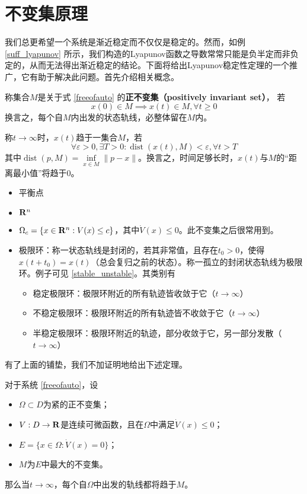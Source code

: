 \section{不变集原理}\label{2Dref}
我们总更希望一个系统是渐近稳定而不仅仅是稳定的。然而，如例 \ref{suff_lyapunov} 所示，我们构造的Lyapunov函数之导数常常只能是负半定而非负定的，从而无法得出渐近稳定的结论。下面将给出Lyapunov稳定性定理的一个推广，它有助于解决此问题。首先介绍相关概念。
\begin{definition}
	称集合$M$是关于式 \eqref{freeofauto} 的{\bf 正不变集（positively invariant set）}，
	若\[x(0)\in M\implies x(t)\in M,\forall t\ge0\]
	换言之，每个自$M$内出发的状态轨线，必整体留在$M$内。
\end{definition}
\begin{definition}
	称$t\to\infty$时，$x(t)$趋于一集合$M$，若\[\forall \varepsilon>0,\exists T>0:\operatorname{dist}(x(t),M)<\varepsilon,\forall t>T\]
	其中$\operatorname{dist}(p,M)=\inf\limits_{x\in M}\|p-x\|$。换言之，时间足够长时，$x(t)$与$M$的“距离最小值”将趋于0。
\end{definition}
\begin{example}[不变集]\label{invset}
	\begin{itemize}[leftmargin=1em]
		\item 平衡点
		\item $\mathbf{R}{}^n$
		\item $\Omega_c=\{x\in\mathbf{R}{}^n:V(x)\le c\}$，其中$\dot{V}(x)\le 0$。此不变集之后很常用到。
		\item 极限环：称一状态轨线是封闭的，若其非常值，且存在$t_0>0$，使得$x(t+t_0)=x(t)$（总会复归之前的状态）。称一孤立的封闭状态轨线为极限环。例子可见 \ref{stable_unstable}。其类别有
		\begin{itemize}[leftmargin=1em]
			\item 稳定极限环：极限环附近的所有轨迹皆收敛于它（$t\to\infty$）
			\item 不稳定极限环：极限环附近的所有轨迹皆不收敛于它（$t\to\infty$）
			\item 半稳定极限环：极限环附近的轨迹，部分收敛于它，另一部分发散（$t\to\infty$）
		\end{itemize}
	\end{itemize}
\end{example}
有了上面的铺垫，我们不加证明地给出下述定理。
\begin{theorem}[LaSalle不变集原理]\label{lasalle}
	对于系统 \eqref{freeofauto}，设\begin{itemize}[leftmargin=1em]
		\item $\Omega\subset D$为紧的正不变集；
		\item $V:D\to\mathbf{R}{}$是连续可微函数，且在$\Omega$中满足$\dot{V}(x)\le 0$；
		\item $E=\{x\in\Omega: \dot{V}(x)= 0\}$；
		\item $M$为$E$中最大的不变集。
	\end{itemize}
	那么当$t\to\infty$，每个自$\Omega$中出发的轨线都将趋于$M$。
\end{theorem}
